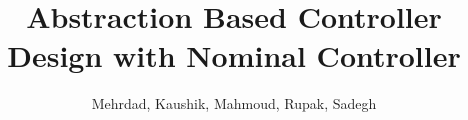 \documentclass{llncs}
\title{Abstraction Based Controller Design with Nominal Controller}
\author{Mehrdad, Kaushik, Mahmoud, Rupak, Sadegh}
\begin{document}
\maketitle

\begin{abstract}
	
\end{abstract}



	 





\end{document}
